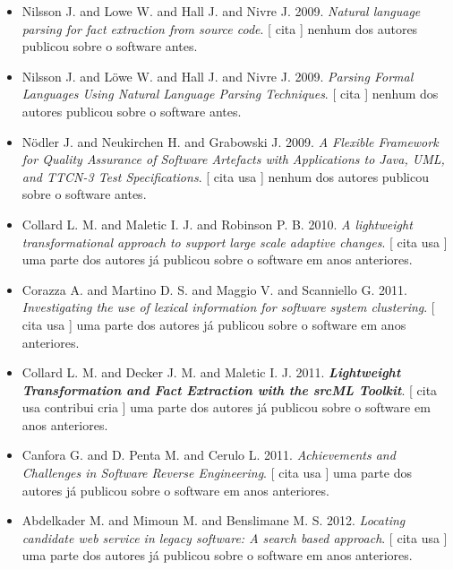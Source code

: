 \begin{itemize}
      [
          cita
      ]
uma parte dos autores já publicou sobre o software em anos anteriores.
\item Nilsson J. and Lowe W. and Hall J. and Nivre J.
      2009.
        \textit{ Natural language parsing for fact extraction from source code}.
      [
          cita
      ]
nenhum dos autores publicou sobre o software antes.
\item Nilsson J. and L\"{o}we W. and Hall J. and Nivre J.
      2009.
        \textit{ Parsing Formal Languages Using Natural Language Parsing Techniques}.
      [
          cita
      ]
nenhum dos autores publicou sobre o software antes.
\item Nödler J. and Neukirchen H. and Grabowski J.
      2009.
        \textit{ A Flexible Framework for Quality Assurance of Software Artefacts with Applications to Java, UML, and TTCN-3 Test Specifications}.
      [
          cita
          usa
      ]
nenhum dos autores publicou sobre o software antes.
\item Collard L. M. and Maletic I. J. and Robinson P. B.
      2010.
        \textit{ A lightweight transformational approach to support large scale adaptive changes}.
      [
          cita
          usa
      ]
uma parte dos autores já publicou sobre o software em anos anteriores.
\item Corazza A. and Martino D. S. and Maggio V. and Scanniello G.
      2011.
        \textit{ Investigating the use of lexical information for software system clustering}.
      [
          cita
          usa
      ]
uma parte dos autores já publicou sobre o software em anos anteriores.
\item Collard L. M. and Decker J. M. and Maletic I. J.
      2011.
        \textbf{\textit{ Lightweight Transformation and Fact Extraction with the srcML Toolkit}}.
      [
          cita
          usa
          contribui
          cria
      ]
uma parte dos autores já publicou sobre o software em anos anteriores.
\item Canfora G. and D. Penta M. and Cerulo L.
      2011.
        \textit{ Achievements and Challenges in Software Reverse Engineering}.
      [
          cita
          usa
      ]
uma parte dos autores já publicou sobre o software em anos anteriores.
\item Abdelkader M. and Mimoun M. and Benslimane M. S.
      2012.
        \textit{ Locating candidate web service in legacy software: A search based approach}.
      [
          cita
          usa
      ]
uma parte dos autores já publicou sobre o software em anos anteriores.

\end{itemize}
